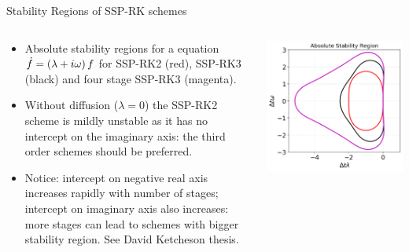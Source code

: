 \documentclass[aspectratio=169]{beamer}
\begin{document}
\begin{frame}{Stability Regions of SSP-RK schemes}

  \begin{columns}
    
    \begin{column}{0.5\linewidth}
      \small%
      \begin{itemize}
      \item Absolute stability regions for a equation
        $\dot{f} = (\lambda+i\omega)\thinspace f$ for SSP-RK2 (red),
        SSP-RK3 (black) and four stage SSP-RK3 (magenta).
      \item Without diffusion ($\lambda=0$) the SSP-RK2 scheme is
        mildly unstable as it has no intercept on the imaginary axis:
        the third order schemes should be preferred.
      \item Notice: intercept on negative real axis increases rapidly
        with number of stages; intercept on imaginary axis also
        increases: more stages can lead to schemes with bigger
        stability region. See David Ketcheson thesis.
      \end{itemize}
    \end{column}
    
    \begin{column}{0.5\linewidth}
      \includegraphics[width=\linewidth]{ssp-rk-abs-stability.png}
    \end{column}
  \end{columns}  
  
\end{frame}
\end{document}
